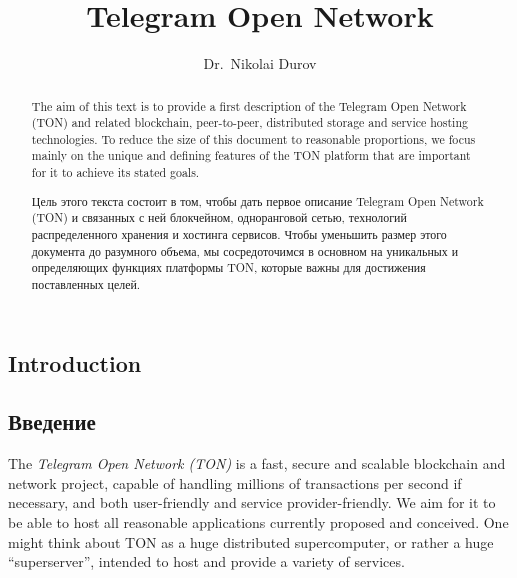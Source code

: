 \documentclass[12pt,oneside]{article}
\title{Telegram Open Network}
\author{Dr.\ Nikolai Durov}%
\def\markbothsame#1{\fancyhead[C]{#1}}
\begin{document}
\maketitle

\begin{English}
    \begin{abstract}
        The aim of this text is to provide a first description of the
        Telegram Open Network (TON) and related blockchain, peer-to-peer,
        distributed storage and service hosting technologies. To reduce the
        size of this document to reasonable proportions, we focus mainly on
        the unique and defining features of the TON platform that are
        important for it to achieve its stated goals.
    \end{abstract}
\end{English}

\begin{Russian}
    \begin{abstract}
        Цель этого текста состоит в том, чтобы дать первое описание
        Telegram Open Network (TON) и связанных с ней блокчейном, одноранговой сетью,
        технологий распределенного хранения и хостинга сервисов. Чтобы уменьшить
        размер этого документа до разумного объема, мы сосредоточимся в основном на
        уникальных и определяющих функциях платформы TON, которые
        важны для достижения поставленных целей.
    \end{abstract}
\end{Russian}

\begin{English}
    \section*{Introduction}
    \markbothsame{Introduction}
\end{English}

\begin{Russian}
    \section*{Введение}
    \markbothsame{Введение}
\end{Russian}

\begin{English}
    The {\em Telegram Open Network (TON)} is a fast, secure and scalable
    blockchain and network project, capable of handling millions of
    transactions per second if necessary, and both user-friendly and
    service provider-friendly. We aim for it to be able to host all
    reasonable applications currently proposed and conceived. One might
    think about TON as a huge distributed supercomputer, or rather a huge
    ``superserver'', intended to host and provide a variety of services.
\end{English}
\end{document}
